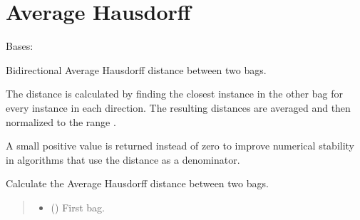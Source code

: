 \documentclass[letterpaper,10pt,english]{sphinxmanual}
\begin{document}
\section{Average Hausdorff}
\label{\detokenize{core/index:average-hausdorff}}

\begin{fulllineitems}
\label{\detokenize{core/index:miml.core.average_hausdorff.AverageHausdorff}}
\pysigstartsignatures
\pysigline
{}
\pysigstopsignatures
\sphinxAtStartPar
Bases: {\hyperref[\detokenize{core/index:miml.core.hausdorff_distance.HausdorffDistance}]{}}

\sphinxAtStartPar
Bidirectional Average Hausdorff distance between two bags.

\sphinxAtStartPar
The distance is calculated by finding the closest instance in the
other bag for every instance in each direction. The resulting
distances are averaged and then normalized to the range \sphinxcode{\sphinxupquote{{[}0, 1)}}.

\sphinxAtStartPar
A small positive value is returned instead of zero to improve
numerical stability in algorithms that use the distance as a
denominator.

\begin{fulllineitems}
\label{\detokenize{core/index:miml.core.average_hausdorff.AverageHausdorff.distance}}
\pysigstartsignatures
\pysiglinewithargsret
{}
{\sphinxparamcomma {}}
{}
\pysigstopsignatures
\sphinxAtStartPar
Calculate the Average Hausdorff distance between two bags.
\begin{quote}\begin{description}
\begin{itemize}
\item {} 
\sphinxAtStartPar
{} ({\hyperref[\detokenize{data/_autosummary/miml.data.bag.Bag:miml.data.bag.Bag}]{}}) \textendash{} First bag.


\end{itemize}
\end{description}
\end{quote}
\end{fulllineitems}
\end{fulllineitems}
\end{document}
